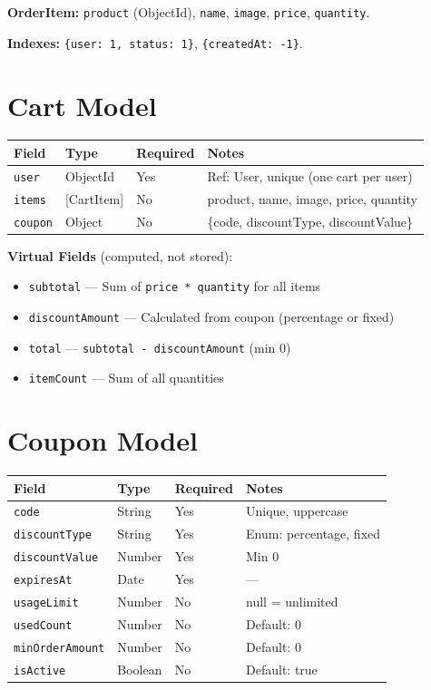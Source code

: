 \textbf{OrderItem:} \texttt{product} (ObjectId), \texttt{name}, \texttt{image}, \texttt{price}, \texttt{quantity}.

\textbf{Indexes:} \texttt{\{user: 1, status: 1\}}, \texttt{\{createdAt: -1\}}.

\section{Cart Model}

\begin{longtable}{@{}p{3.5cm}p{3.5cm}p{2cm}p{5cm}@{}}
  \toprule
  \textbf{Field} & \textbf{Type} & \textbf{Required} & \textbf{Notes} \\
  \midrule
  \texttt{user}    & ObjectId & Yes & Ref: User, unique (one cart per user) \\
  \texttt{items}   & [CartItem] & No & product, name, image, price, quantity \\
  \texttt{coupon}  & Object   & No  & \{code, discountType, discountValue\} \\
  \bottomrule
\end{longtable}

\textbf{Virtual Fields} (computed, not stored):
\begin{itemize}
  \item \texttt{subtotal} --- Sum of \texttt{price * quantity} for all items
  \item \texttt{discountAmount} --- Calculated from coupon (percentage or fixed)
  \item \texttt{total} --- \texttt{subtotal - discountAmount} (min 0)
  \item \texttt{itemCount} --- Sum of all quantities
\end{itemize}

\section{Coupon Model}

\begin{longtable}{@{}p{3.5cm}p{3cm}p{2cm}p{5.5cm}@{}}
  \toprule
  \textbf{Field} & \textbf{Type} & \textbf{Required} & \textbf{Notes} \\
  \midrule
  \texttt{code}           & String  & Yes & Unique, uppercase \\
  \texttt{discountType}   & String  & Yes & Enum: percentage, fixed \\
  \texttt{discountValue}  & Number  & Yes & Min 0 \\
  \texttt{expiresAt}      & Date    & Yes & --- \\
  \texttt{usageLimit}     & Number  & No  & null = unlimited \\
  \texttt{usedCount}      & Number  & No  & Default: 0 \\
  \texttt{minOrderAmount} & Number  & No  & Default: 0 \\
  \texttt{isActive}       & Boolean & No  & Default: true \\
  \bottomrule
\end{longtable}

